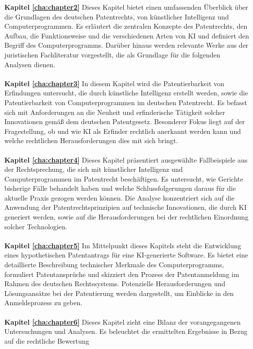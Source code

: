 \textbf{Kapitel \ref{cha:chapter2}} 
Dieses Kapitel bietet einen umfassenden Überblick über die Grundlagen des deutschen Patentrechts, 
von künstlicher Intelligenz und Computerprogrammen. 
Es erläutert die zentralen Konzepte des Patentrechts, 
den Aufbau, 
die Funktionsweise und die verschiedenen Arten von KI und definiert den Begriff des Computerprogramms. 
Darüber hinaus werden relevante Werke aus der juristischen Fachliteratur vorgestellt, 
die als Grundlage für die folgenden Analysen dienen.
\\
\\
\textbf{Kapitel \ref{cha:chapter3}} 
In diesem Kapitel wird die Patentierbarkeit von Erfindungen untersucht,
die durch künstliche Intelligenz erstellt werden, 
sowie die Patentierbarkeit von Computerprogrammen im deutschen Patentrecht. 
Es befasst sich mit Anforderungen an die Neuheit 
und erfinderische Tätigkeit solcher Innovationen gemäß dem deutschen Patentgesetz. 
Besonderer Fokus liegt auf der Fragestellung, 
ob und wie KI als Erfinder rechtlich anerkannt werden kann 
und welche rechtlichen Herausforderungen dies mit sich bringt.
\\
\\
\textbf{Kapitel \ref{cha:chapter4}} 
Dieses Kapitel präsentiert ausgewählte Fallbeispiele aus der Rechtsprechung, 
die sich mit künstlicher Intelligenz und Computerprogrammen im Patentrecht beschäftigen. 
Es untersucht, wie Gerichte bisherige Fälle behandelt haben 
und welche Schlussfolgerungen daraus für die aktuelle Praxis gezogen werden können. 
Die Analyse konzentriert sich auf die Anwendung der Patentrechtsprinzipien auf technische Innovationen, 
die durch KI generiert werden, 
sowie auf die Herausforderungen bei der rechtlichen Einordnung solcher Technologien.
\\
\\
\textbf{Kapitel \ref{cha:chapter5}} 
Im Mittelpunkt dieses Kapitels steht die Entwicklung eines hypothetischen Patentantrags 
für eine KI-generierte Software. 
Es bietet eine detaillierte Beschreibung technischer Merkmale des Computerprogramms, 
formuliert Patentansprüche und skizziert den Prozess der Patentanmeldung im Rahmen des deutschen Rechtssystems. 
Potenzielle Herausforderungen und Lösungsansätze bei der Patentierung werden dargestellt, 
um Einblicke in den Anmeldeprozess zu geben.
\\
\\
\textbf{Kapitel \ref{cha:chapter6}} 
Dieses Kapitel zieht eine Bilanz der vorangegangenen Untersuchungen und Analysen. 
Es beleuchtet die ermittelten Ergebnisse in Bezug auf die rechtliche Bewertung 
